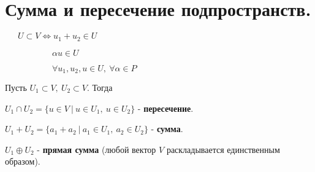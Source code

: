 \documentclass[a4paper, 12pt]{report}
\begin{document}
	
	
	
	
	
	
	\section{Сумма и пересечение подпространств.}
	$\quad \; \  U\subset V \Longleftrightarrow u_1 + u_2 \in U$
	
	$\qquad\qquad\quad \; \  \alpha u \in U$
	
	$\qquad\qquad\quad \; \   \forall u_1, u_2, u \in U,\  \forall \alpha \in P $
	
	Пусть $U_1 \subset V,\  U_2\subset V$. Тогда
	
	$U_1 \cap U_2 = \{u\in V \ | \  u\in U_1,\  u\in U_2\}$ - \textbf{пересечение}.
	
	$U_1 + U_2 = \{a_1 + a_2 \ |\  a_1\in U_1,\  a_2\in U_2\}$ - \textbf{сумма}.
	
	$U_1 \oplus U_2 $ - \textbf{прямая сумма} (любой вектор $V$ раскладывается единственным образом).
	
\end{document}
